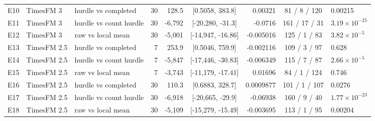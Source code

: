 \begin{table}[htbp]
\begin{tabular}{lllrrcrcl}
E10 & TimesFM 3 & hurdle vs completed & 30 & 128.5 & [0.5058, 383.8] & 0.00321 & 81 / 8 / 120 & 0.00215 \\
E11 & TimesFM 3 & hurdle vs count hurdle & 30 & -6,792 & [-20,280, -31.3] & -0.0716 & 161 / 17 / 31 & $3.19 \times 10^{-25}$ \\
E12 & TimesFM 3 & raw vs local mean & 30 & -5,001 & [-14,947, -16.86] & -0.005016 & 125 / 1 / 83 & $3.82 \times 10^{-5}$ \\
E13 & TimesFM 2.5 & hurdle vs completed & 7 & 253.9 & [0.5046, 759.9] & -0.002116 & 109 / 3 / 97 & 0.628 \\
E14 & TimesFM 2.5 & hurdle vs count hurdle & 7 & -5,847 & [-17,446, -30.83] & -0.006349 & 115 / 7 / 87 & $2.66 \times 10^{-5}$ \\
E15 & TimesFM 2.5 & raw vs local mean & 7 & -3,743 & [-11,179, -17.41] & 0.01696 & 84 / 1 / 124 & 0.746 \\
E16 & TimesFM 2.5 & hurdle vs completed & 30 & 110.3 & [0.6883, 328.7] & 0.0009877 & 101 / 1 / 107 & 0.0276 \\
E17 & TimesFM 2.5 & hurdle vs count hurdle & 30 & -6,918 & [-20,665, -29.9] & -0.06938 & 160 / 9 / 40 & $1.77 \times 10^{-23}$ \\
E18 & TimesFM 2.5 & raw vs local mean & 30 & -5,109 & [-15,279, -15.49] & -0.003695 & 113 / 1 / 95 & 0.00204 \\
\bottomrule
\end{tabular}
\end{table}


